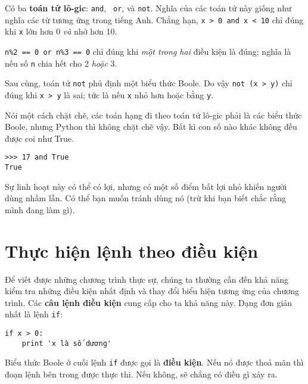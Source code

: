 \documentclass[11pt]{book}
\begin{document}
Có ba {\bf toán tử lô-gic}: {\tt and}, {\tt
or}, và {\tt not}. Nghĩa của các toán tử này giống như nghĩa
các từ tương ứng trong tiếng Anh. Chẳng hạn,
{\tt x > 0 and x < 10} chỉ đúng khi {\tt x} lớn hơn 0
{\em và} nhở hơn 10.


{\tt n\%2 == 0 or n\%3 == 0} chỉ đúng khi {\em một trong hai} 
điều kiện là đúng; nghĩa là nếu số {\tt n} chia hết cho 2 {\em hoặc} 3.

Sau cùng, toán tử {\tt not} phủ định một biểu thức Boole. Do vậy 
{\tt not (x > y)} chỉ đúng khi {\tt x > y} là sai; tức là nếu
{\tt x} nhỏ hơn hoặc bằng {\tt y}.

Nói một cách chặt chẽ, các toán hạng đi theo toán tử lô-gic phải là
các biểu thức Boole, nhưng Python thì không chặt chẽ vậy. Bất kì
con số nào khác không đều được coi như True.

\beforeverb
\begin{verbatim}
>>> 17 and True
True
\end{verbatim}
\afterverb
%
Sự linh hoạt này có thể có lợi, nhưng có một số điểm bất lợi nhỏ 
khiến người dùng nhầm lẫn. Có thể bạn muốn tránh dùng nó (trừ khi
bạn biết chắc rằng mình đang làm gì).


\section{Thực hiện lệnh theo điều kiện}
\label{conditional execution}


Để viết được những chương trình thực sự, chúng ta thường cần đến
khả năng kiểm tra những điều kiện nhất định và thay đổi biểu hiện
tương ứng của chương trình. Các {\bf câu lệnh điều kiện} cung cấp
cho ta khả năng này. Dạng đơn giản nhất là lệnh {\tt if}:

\beforeverb
\begin{verbatim}
if x > 0:
    print 'x là số dương'
\end{verbatim}
\afterverb
%
Biểu thức Boole ở cuối lệnh {\tt if} được gọi là 
{\bf điều kiện}. Nếu nó được thoả mãn thì đoạn lệnh bên trong 
được thực thi. Nếu không, sẽ chẳng có điều gì xảy ra.

\end{document}
